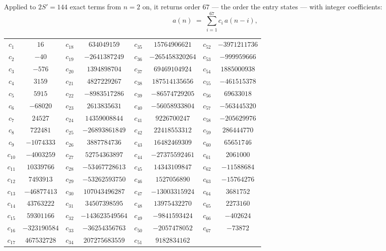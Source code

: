 \documentclass[11pt,a4paper]{article}
\theoremstyle{plain}
\theoremstyle{definition}
\begin{document}
Applied to $2S'=144$ exact terms from $n=2$ on, it returns order $67$ --- the
order the entry states --- with integer coefficients:
\[
a(n)\;=\;\sum_{i=1}^{67}c_i\,a(n-i),
\]
\begin{center}\small
\begin{tabular}{cccccccc}
$c_{1}$ & $16$ & $c_{18}$ & $634049159$ & $c_{35}$ & $15764906621$ & $c_{52}$ & $-3971211736$ \\
$c_{2}$ & $-40$ & $c_{19}$ & $-2641387249$ & $c_{36}$ & $-265458320264$ & $c_{53}$ & $-999959666$ \\
$c_{3}$ & $-576$ & $c_{20}$ & $1394898704$ & $c_{37}$ & $69469104924$ & $c_{54}$ & $1885000938$ \\
$c_{4}$ & $3159$ & $c_{21}$ & $4827229267$ & $c_{38}$ & $187514135656$ & $c_{55}$ & $-461515378$ \\
$c_{5}$ & $5915$ & $c_{22}$ & $-8983517286$ & $c_{39}$ & $-86574729205$ & $c_{56}$ & $69633018$ \\
$c_{6}$ & $-68020$ & $c_{23}$ & $2613835631$ & $c_{40}$ & $-56058933804$ & $c_{57}$ & $-563445320$ \\
$c_{7}$ & $24527$ & $c_{24}$ & $14359008844$ & $c_{41}$ & $9226700247$ & $c_{58}$ & $-205629976$ \\
$c_{8}$ & $722481$ & $c_{25}$ & $-26893861849$ & $c_{42}$ & $22418553312$ & $c_{59}$ & $286444770$ \\
$c_{9}$ & $-1074333$ & $c_{26}$ & $3887784736$ & $c_{43}$ & $16482469309$ & $c_{60}$ & $65651746$ \\
$c_{10}$ & $-4003259$ & $c_{27}$ & $52754363897$ & $c_{44}$ & $-27375592461$ & $c_{61}$ & $2061000$ \\
$c_{11}$ & $10339766$ & $c_{28}$ & $-53467728613$ & $c_{45}$ & $14343109847$ & $c_{62}$ & $-11588684$ \\
$c_{12}$ & $7493913$ & $c_{29}$ & $-53262593750$ & $c_{46}$ & $1527056890$ & $c_{63}$ & $-15764276$ \\
$c_{13}$ & $-46877413$ & $c_{30}$ & $107043496287$ & $c_{47}$ & $-13003315924$ & $c_{64}$ & $3681752$ \\
$c_{14}$ & $43763222$ & $c_{31}$ & $34507398595$ & $c_{48}$ & $13975432270$ & $c_{65}$ & $2273160$ \\
$c_{15}$ & $59301166$ & $c_{32}$ & $-143623549564$ & $c_{49}$ & $-9841593424$ & $c_{66}$ & $-402624$ \\
$c_{16}$ & $-323190584$ & $c_{33}$ & $-36254356763$ & $c_{50}$ & $-2057478052$ & $c_{67}$ & $-73872$ \\
$c_{17}$ & $467532728$ & $c_{34}$ & $207275683559$ & $c_{51}$ & $9182834162$ &  &  \\
\end{tabular}
\end{center}
\end{document}
